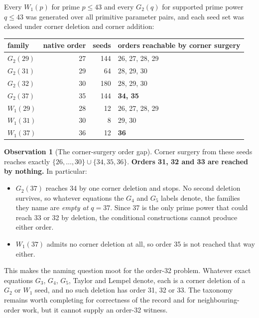 \documentclass[11pt,a4paper]{article}
\theoremstyle{definition}
\newtheorem{observation}[theorem]{Observation}
\begin{document}
Every $W_1(p)$ for prime $p\le43$ and every $G_2(q)$ for supported prime power
$q\le43$ was generated over all primitive parameter pairs, and each seed set was
closed under corner deletion and corner addition:

\begin{center}
\begin{tabular}{@{}lrrl@{}}
\toprule
family & native order & seeds & orders reachable by corner surgery \\
\midrule
$G_2(29)$ & 27 & 144 & 26, 27, 28, 29 \\
$G_2(31)$ & 29 & 64 & 28, 29, 30 \\
$G_2(32)$ & 30 & 180 & 28, 29, 30 \\
$G_2(37)$ & 35 & 144 & \textbf{34, 35} \\
$W_1(29)$ & 28 & 12 & 26, 27, 28, 29 \\
$W_1(31)$ & 30 & 8 & 29, 30 \\
$W_1(37)$ & 36 & 12 & \textbf{36} \\
\bottomrule
\end{tabular}
\end{center}

\begin{observation}[The corner-surgery order gap]
\label{obs:ordergap}
Corner surgery from these seeds reaches exactly
$\{26,\dots,30\}\cup\{34,35,36\}$. \textbf{Orders 31, 32 and 33 are reached by
nothing.} In particular:
\begin{itemize}
\item $G_2(37)$ reaches 34 by one corner deletion and stops. No second deletion
  survives, so whatever equations the $G_4$ and $G_5$ labels denote, the families
  they name are \emph{empty at $q=37$}. Since 37 is the only prime power that
  could reach 33 or 32 by deletion, the conditional constructions cannot produce
  either order.
\item $W_1(37)$ admits no corner deletion at all, so order 35 is not reached that
  way either.
\end{itemize}
\end{observation}

This makes the naming question moot for the order-32 problem. Whatever exact
equations $G_3$, $G_4$, $G_5$, Taylor and Lempel denote, each is a corner
deletion of a $G_2$ or $W_1$ seed, and no such deletion has order 31, 32 or 33.
The taxonomy remains worth completing for correctness of the record and for
neighbouring-order work, but it cannot supply an order-32 witness.
\end{document}

